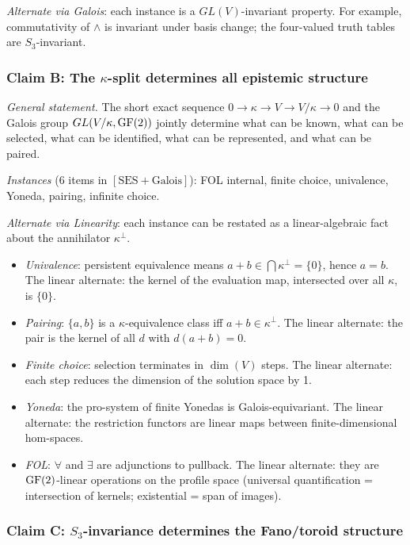 \emph{Alternate via Galois}: each instance is a
$GL(V)$-invariant property. For example, commutativity
of $\wedge$ is invariant under basis change; the
four-valued truth tables are $S_3$-invariant.

\subsubsection*{Claim B: The $\kappa$-split determines
  all epistemic structure}

\emph{General statement.}
The short exact sequence $0 \to \kappa \to V \to
V/\kappa \to 0$ and the Galois group
$GL(V/\kappa, \operatorname{GF}(2))$ jointly determine what can be
known, what can be selected, what can be identified,
what can be represented, and what can be paired.

\emph{Instances} (6 items in $[\mathrm{SES}{+}
\mathrm{Galois}]$): FOL internal, finite choice,
univalence, Yoneda, pairing, infinite choice.

\emph{Alternate via Linearity}: each instance can be
restated as a linear-algebraic fact about the
annihilator $\kappa^\perp$.
\begin{itemize}[nosep]
  \item \emph{Univalence}: persistent equivalence means
    $a + b \in \bigcap \kappa^\perp = \{0\}$,
    hence $a = b$. The linear alternate: the kernel
    of the evaluation map, intersected over all $\kappa$,
    is $\{0\}$.
  \item \emph{Pairing}: $\{a, b\}$ is a
    $\kappa$-equivalence class iff
    $a + b \in \kappa^\perp$. The linear alternate:
    the pair is the kernel of all $d$ with
    $d(a + b) = 0$.
  \item \emph{Finite choice}: selection terminates in
    $\dim(V)$ steps. The linear alternate: each step
    reduces the dimension of the solution space by 1.
  \item \emph{Yoneda}: the pro-system of finite Yonedas
    is Galois-equivariant. The linear alternate: the
    restriction functors are linear maps between
    finite-dimensional hom-spaces.
  \item \emph{FOL}: $\forall$ and $\exists$ are
    adjunctions to pullback. The linear alternate: they
    are $\operatorname{GF}(2)$-linear operations on the profile space
    (universal quantification = intersection of kernels;
    existential = span of images).
\end{itemize}

\subsubsection*{Claim C: $S_3$-invariance determines the
  Fano/toroid structure}

